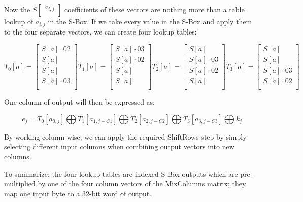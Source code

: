 \documentclass{article}
\begin{document}
Now the $S \begin{bmatrix} a_{i,j} \\ \end{bmatrix}$ coefficients of these vectors are nothing more than a table lookup of $a_{i,j}$ in the S-Box.
If we take every value in the S-Box and apply them to the four separate vectors, we can create four lookup tables:

\[
T_{0}[a] =
\begin{bmatrix}
S[a] \cdot 02 \\
S[a] \\
S[a] \\
S[a] \cdot 03 \\
\end{bmatrix}
T_{1}[a] =
\begin{bmatrix}
S[a] \cdot 03 \\
S[a] \cdot 02\\
S[a] \\
S[a] \\
\end{bmatrix}
T_{2}[a] =
\begin{bmatrix}
S[a] \\
S[a] \cdot 03 \\
S[a] \cdot 02\\
S[a] \\
\end{bmatrix}
T_{3}[a] =
\begin{bmatrix}
S[a] \\
S[a] \\
S[a] \cdot 03\\
S[a] \cdot 02\\
\end{bmatrix}
\]

One column of output will then be expressed as:

\[
e_{j} = T_{0}[a_{0,j}]
\bigoplus
T_{1}[a_{1,j-C1}]
\bigoplus
T_{2}[a_{2,j-C2}]
\bigoplus
T_{3}[a_{3,j-C3}]
\bigoplus
k_{j}
\]

By working column-wise, we can apply the required ShiftRows step by simply selecting different input columns when combining output vectors into new columns.

To summarize: the four lookup tables are indexed S-Box outputs which are pre-multiplied by one of the four column vectors of the MixColumns matrix; they map one input byte to a 32-bit word of output.

\end{document}
